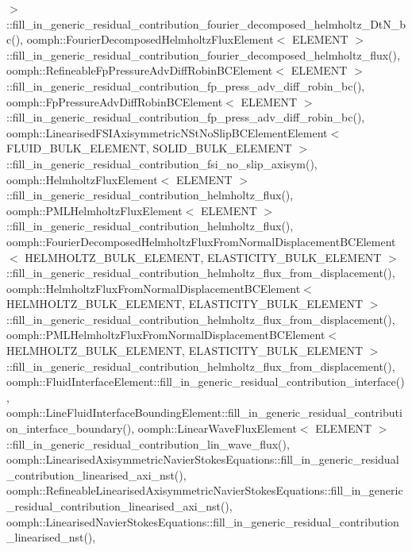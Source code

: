 $>$\+::fill\+\_\+in\+\_\+generic\+\_\+residual\+\_\+contribution\+\_\+fourier\+\_\+decomposed\+\_\+helmholtz\+\_\+\+Dt\+N\+\_\+bc(), oomph\+::\+Fourier\+Decomposed\+Helmholtz\+Flux\+Element$<$ E\+L\+E\+M\+E\+N\+T $>$\+::fill\+\_\+in\+\_\+generic\+\_\+residual\+\_\+contribution\+\_\+fourier\+\_\+decomposed\+\_\+helmholtz\+\_\+flux(), oomph\+::\+Refineable\+Fp\+Pressure\+Adv\+Diff\+Robin\+B\+C\+Element$<$ E\+L\+E\+M\+E\+N\+T $>$\+::fill\+\_\+in\+\_\+generic\+\_\+residual\+\_\+contribution\+\_\+fp\+\_\+press\+\_\+adv\+\_\+diff\+\_\+robin\+\_\+bc(), oomph\+::\+Fp\+Pressure\+Adv\+Diff\+Robin\+B\+C\+Element$<$ E\+L\+E\+M\+E\+N\+T $>$\+::fill\+\_\+in\+\_\+generic\+\_\+residual\+\_\+contribution\+\_\+fp\+\_\+press\+\_\+adv\+\_\+diff\+\_\+robin\+\_\+bc(), oomph\+::\+Linearised\+F\+S\+I\+Axisymmetric\+N\+St\+No\+Slip\+B\+C\+Element\+Element$<$ F\+L\+U\+I\+D\+\_\+\+B\+U\+L\+K\+\_\+\+E\+L\+E\+M\+E\+N\+T, S\+O\+L\+I\+D\+\_\+\+B\+U\+L\+K\+\_\+\+E\+L\+E\+M\+E\+N\+T $>$\+::fill\+\_\+in\+\_\+generic\+\_\+residual\+\_\+contribution\+\_\+fsi\+\_\+no\+\_\+slip\+\_\+axisym(), oomph\+::\+Helmholtz\+Flux\+Element$<$ E\+L\+E\+M\+E\+N\+T $>$\+::fill\+\_\+in\+\_\+generic\+\_\+residual\+\_\+contribution\+\_\+helmholtz\+\_\+flux(), oomph\+::\+P\+M\+L\+Helmholtz\+Flux\+Element$<$ E\+L\+E\+M\+E\+N\+T $>$\+::fill\+\_\+in\+\_\+generic\+\_\+residual\+\_\+contribution\+\_\+helmholtz\+\_\+flux(), oomph\+::\+Fourier\+Decomposed\+Helmholtz\+Flux\+From\+Normal\+Displacement\+B\+C\+Element$<$ H\+E\+L\+M\+H\+O\+L\+T\+Z\+\_\+\+B\+U\+L\+K\+\_\+\+E\+L\+E\+M\+E\+N\+T, E\+L\+A\+S\+T\+I\+C\+I\+T\+Y\+\_\+\+B\+U\+L\+K\+\_\+\+E\+L\+E\+M\+E\+N\+T $>$\+::fill\+\_\+in\+\_\+generic\+\_\+residual\+\_\+contribution\+\_\+helmholtz\+\_\+flux\+\_\+from\+\_\+displacement(), oomph\+::\+Helmholtz\+Flux\+From\+Normal\+Displacement\+B\+C\+Element$<$ H\+E\+L\+M\+H\+O\+L\+T\+Z\+\_\+\+B\+U\+L\+K\+\_\+\+E\+L\+E\+M\+E\+N\+T, E\+L\+A\+S\+T\+I\+C\+I\+T\+Y\+\_\+\+B\+U\+L\+K\+\_\+\+E\+L\+E\+M\+E\+N\+T $>$\+::fill\+\_\+in\+\_\+generic\+\_\+residual\+\_\+contribution\+\_\+helmholtz\+\_\+flux\+\_\+from\+\_\+displacement(), oomph\+::\+P\+M\+L\+Helmholtz\+Flux\+From\+Normal\+Displacement\+B\+C\+Element$<$ H\+E\+L\+M\+H\+O\+L\+T\+Z\+\_\+\+B\+U\+L\+K\+\_\+\+E\+L\+E\+M\+E\+N\+T, E\+L\+A\+S\+T\+I\+C\+I\+T\+Y\+\_\+\+B\+U\+L\+K\+\_\+\+E\+L\+E\+M\+E\+N\+T $>$\+::fill\+\_\+in\+\_\+generic\+\_\+residual\+\_\+contribution\+\_\+helmholtz\+\_\+flux\+\_\+from\+\_\+displacement(), oomph\+::\+Fluid\+Interface\+Element\+::fill\+\_\+in\+\_\+generic\+\_\+residual\+\_\+contribution\+\_\+interface(), oomph\+::\+Line\+Fluid\+Interface\+Bounding\+Element\+::fill\+\_\+in\+\_\+generic\+\_\+residual\+\_\+contribution\+\_\+interface\+\_\+boundary(), oomph\+::\+Linear\+Wave\+Flux\+Element$<$ E\+L\+E\+M\+E\+N\+T $>$\+::fill\+\_\+in\+\_\+generic\+\_\+residual\+\_\+contribution\+\_\+lin\+\_\+wave\+\_\+flux(), oomph\+::\+Linearised\+Axisymmetric\+Navier\+Stokes\+Equations\+::fill\+\_\+in\+\_\+generic\+\_\+residual\+\_\+contribution\+\_\+linearised\+\_\+axi\+\_\+nst(), oomph\+::\+Refineable\+Linearised\+Axisymmetric\+Navier\+Stokes\+Equations\+::fill\+\_\+in\+\_\+generic\+\_\+residual\+\_\+contribution\+\_\+linearised\+\_\+axi\+\_\+nst(), oomph\+::\+Linearised\+Navier\+Stokes\+Equations\+::fill\+\_\+in\+\_\+generic\+\_\+residual\+\_\+contribution\+\_\+linearised\+\_\+nst(), 